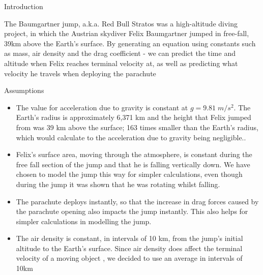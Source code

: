 \documentclass[final]{beamer}
\newlength{\onecolwid}
\begin{document}
\begin{frame}
\begin{columns}[t]
\begin{column}{\onecolwid}
\begin{exampleblock}{Introduction}

The Baumgartner jump, a.k.a. Red Bull Stratos was a high-altitude diving project, in which the Austrian skydiver Felix Baumgartner jumped in free-fall, 39km above the Earth's surface. By generating an equation using constants such as mass, air density and the drag coefficient - we can predict the time and altitude when Felix reaches terminal velocity at, as well as predicting what velocity he travels when deploying the parachute

\end{exampleblock}


\begin{exampleblock}{Assumptions}
\begin{itemize}
\item The value for acceleration due to gravity is constant at $g = 9.81\;m/s^2$. The Earth's radius is approximately 6,371 km and the height that Felix jumped from was 39 km above the surface; 163 times smaller than the Earth's radius, which would calculate to the acceleration due to gravity being negligible.\cite{Sharp}.

\item Felix's surface area, moving through the atmosphere, is constant during the free fall section of the jump and that he is falling vertically down. We have chosen to model the jump this way for simpler calculations, even though during the jump it was shown that he was rotating whilst falling.

\item The parachute deploys instantly, so that the increase in drag forces caused by the parachute opening also impacts the jump instantly. This also helps for simpler calculations in modelling the jump.

\item The air density is constant, in intervals of 10 km, from the jump's initial altitude to the Earth's surface. Since air density does affect the terminal velocity of a moving object \cite{Density}, we decided to use an average in intervals of 10km
\end{itemize}


\end{exampleblock}
\end{column}
\end{columns}
\end{frame}
\end{document}
